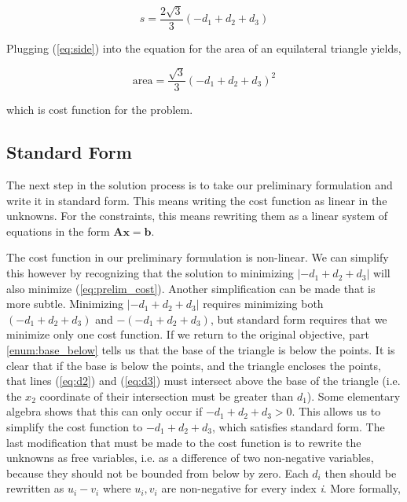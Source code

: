 \documentclass{article}
\begin{document}
\begin{equation} \label{eq:side}
s = \frac{2 \sqrt{3}}{3}(-d_1 + d_2 + d_3)
\end{equation}

\noindent Plugging (\ref{eq:side}) into the equation for the area of an equilateral triangle yields,

\begin{equation} \label{eq:prelim_cost}
\text{area} = \frac{\sqrt{3}}{3}(-d_1 + d_2 + d_3)^2
\end{equation}

\noindent which is cost function for the problem.

\subsection{Standard Form}

The next step in the solution process is to take our preliminary formulation and write it in standard form.
This means writing the cost function as linear in the unknowns. For the constraints, this means rewriting them as a linear system of equations in the form $\mathbf{A} \mathbf{x} = \mathbf{b}$.

The cost function in our preliminary formulation is non-linear.
We can simplify this however by recognizing that the solution to minimizing $|-d_1 + d_2 + d_3|$ will also minimize (\ref{eq:prelim_cost}).
Another simplification can be made that is more subtle.
Minimizing $|-d_1 + d_2 + d_3|$ requires minimizing both $(-d_1 + d_2 + d_3)$ and $-(-d_1 + d_2 + d_3)$, but standard form requires that we minimize only one cost function.
If we return to the original objective, part \ref{enum:base_below} tells us that the base of the triangle is below the points.
It is clear that if the base is below the points, and the triangle encloses the points, that lines (\ref{eq:d2}) and (\ref{eq:d3}) must intersect above the base of the triangle (i.e. the $x_2$ coordinate of their intersection must be greater than $d_1$).
Some elementary algebra shows that this can only occur if $-d_1 + d_2 + d_3 > 0$.
This allows us to simplify the cost function to $-d_1 + d_2 + d_3$, which satisfies standard form.
The last modification that must be made to the cost function is to rewrite the unknowns as free variables, i.e. as a difference of two non-negative variables, because they should not be bounded from below by zero.
Each $d_i$ then should be rewritten as $u_i - v_i$ where $u_i, v_i$ are non-negative for every index \textit{i}.
More formally,
\end{document}
